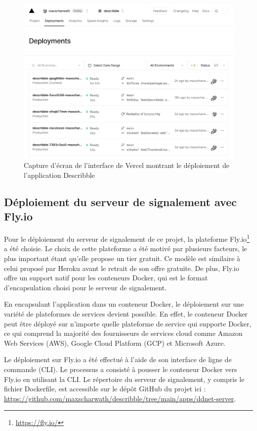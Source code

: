 \begin{figure}[H]
    \centering
    \includegraphics[width=1\textwidth]{assets/figures/vercel-deploy.png}
    \caption{Capture d'écran de l'interface de Vercel montrant le déploiement de l'application \gls{Describble}}
\end{figure}

\subsection{Déploiement du serveur de signalement avec Fly.io}

Pour le déploiement du serveur de signalement de ce projet, la plateforme Fly.io\footnote{\url{https://fly.io/}} a été choisie. Le choix de cette plateforme a été motivé par plusieurs facteurs, le plus important étant qu'elle propose un tier gratuit. Ce modèle est similaire à celui proposé par Heroku avant le retrait de son offre gratuite. De plus, Fly.io offre un support natif pour les conteneurs Docker, qui est le format d'encapsulation choisi pour le serveur de signalement.

En encapsulant l'application dans un conteneur Docker, le déploiement sur une variété de plateformes de services devient possible. En effet, le conteneur Docker peut être déployé sur n'importe quelle plateforme de service qui supporte Docker, ce qui comprend la majorité des fournisseurs de services cloud comme Amazon Web Services (AWS), Google Cloud Platform (GCP) et Microsoft Azure.

Le déploiement sur Fly.io a été effectué à l'aide de son interface de ligne de commande (CLI). Le processus a consisté à pousser le conteneur Docker vers Fly.io en utilisant la CLI. Le répertoire du serveur de signalement, y compris le fichier Dockerfile, est accessible sur le dépôt GitHub du projet ici : \url{https://github.com/maxscharwath/describble/tree/main/apps/ddnet-server}.

